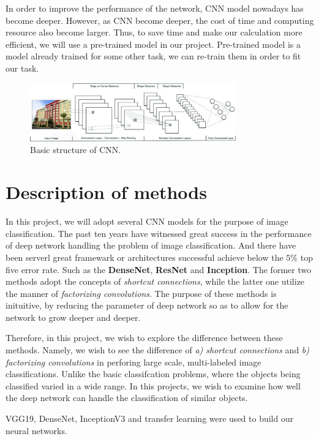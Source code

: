 \documentclass{article}
\begin{document}
In order to improve the performance of the network, CNN model nowadays has become deeper. However, as CNN become deeper, the cost of time and computing resource also become larger. Thus, to save time and make our calculation more efficient, we will use a pre-trained model in our project. Pre-trained model is a model already trained for some other task, we can re-train them in order to fit our task.

\begin{figure}[H]
	\centering
	\includegraphics[width=3.5in]{pics/CNN} 
	\caption{Basic structure of CNN.}
\end{figure}

\section{Description of methods}

In this project, we will adopt several CNN models for the purpose of image classification. 
The past ten years have witnessed great success in the performance of deep network handling the problem of image classification. 
And there have been serverl great framewark or architectures successful achieve below the $5\%$ top five error rate. 
Such as the \textbf{DenseNet}, \textbf{ResNet} and \textbf{Inception}. 
The former two methods adopt the concepts of \emph{shortcut connections}, while the latter one utilize the manner of \emph{factorizing convolutions}. 
The purpose of these methods is inituitive, by reducing the parameter of deep network so as to allow for the network to grow deeper and deeper. 

Therefore, in this project, we wish to explore the difference between these methods. 
Namely, we wish to see the difference of \emph{a) shortcut connections} and \emph{b) factorizing convolutions} in perforing large scale, multi-labeled image classifications.
Unlike the basic classifcation problems, where the objects being classified varied in a wide range.  
In this projects, we wish to examine how well the deep network can handle the classification of similar objects. 



VGG19, DenseNet, InceptionV3 and transfer learning were used to build our neural networks.
\end{document}
